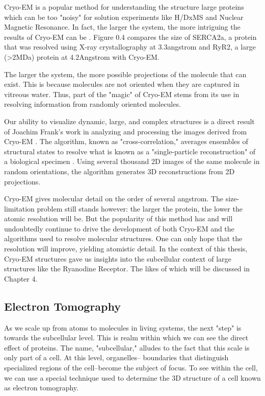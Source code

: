 \documentclass[12pt]{ucsddissertation}
\begin{document}
\begin{dissertationintroduction}
Cryo-EM is a popular method for understanding the structure large proteins which can be too "noisy" for solution experiments like H/DxMS and Nuclear Magnetic Resonance\cite{Ishima2000}. In fact, the larger the system, the more intriguing the results of Cryo-EM can be \cite{Frank1995,Lee2015,Sevvana2018}. Figure 0.4 compares the size of SERCA2a, a protein that was resolved using X-ray crystallography at 3.3\si{angstrom} and RyR2, a large (>2MDa) protein at 4.2\si{Angstrom} with Cryo-EM.

The larger the system, the more possible projections of the molecule that can exist. This is because molecules are not oriented when they are captured in vitreous water. Thus, part of the "magic" of Cryo-EM stems from its use in resolving information from randomly oriented molecules. 

Our ability to visualize dynamic, large, and complex structures is a direct result of Joachim Frank's work in analyzing and processing the images derived from Cryo-EM \cite{Frank1970}. The algorithm, known as "cross-correlation," averages ensembles of structural states to resolve what is known as a "single-particle reconstruction" of a biological specimen \cite{Saxton1976}. Using several thousand 2D images of the same molecule in random orientations, the algorithm generates 3D reconstructions from 2D projections\cite{Frank2009}. 

Cryo-EM gives molecular detail on the order of several \si{angstrom}. The size-limitation problem still stands however: the larger the protein, the lower the atomic resolution will be. But the popularity of this method has and will undoubtedly continue to drive the development of both Cryo-EM and the algorithms used to resolve molecular structures. One can only hope that the resolution will improve, yielding atomistic detail. In the context of this thesis, Cryo-EM structures gave us insights into the subcellular context of large structures like the Ryanodine Receptor. The likes of which will be discussed in Chapter 4. 

\subsection{Electron Tomography}
As we scale up from atoms to molecules in living systems, the next "step" is towards the subcellular level. This is realm within which we can see the direct effect of proteins. The name, "subcellular," alludes to the fact that this scale is only part of a cell. At this level, organelles-- boundaries that distinguish specialized regions of the cell--become the subject of focus. To see within the cell, we can use a special technique used to determine the 3D structure of a cell known as electron tomography. 


\end{dissertationintroduction}
\end{document}
